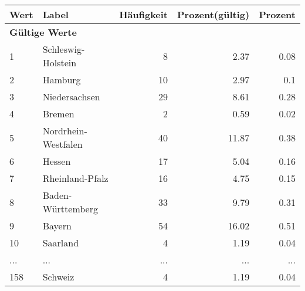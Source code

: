      \begin{longtable}{lXrrr}
     \toprule
     \textbf{Wert} & \textbf{Label} & \textbf{Häufigkeit} & \textbf{Prozent(gültig)} & \textbf{Prozent} \\
     \endhead
     \midrule
     \multicolumn{5}{l}{\textbf{Gültige Werte}}\\
        1 & \multicolumn{1}{X}{Schleswig-Holstein} & %
          \num{8} &
          \num[round-mode=places,round-precision=2]{2,37} &
          \num[round-mode=places,round-precision=2]{0,08} \\
        2 & \multicolumn{1}{X}{Hamburg} & %
          \num{10} &
          \num[round-mode=places,round-precision=2]{2,97} &
          \num[round-mode=places,round-precision=2]{0,1} \\
        3 & \multicolumn{1}{X}{Niedersachsen} & %
          \num{29} &
          \num[round-mode=places,round-precision=2]{8,61} &
          \num[round-mode=places,round-precision=2]{0,28} \\
        4 & \multicolumn{1}{X}{Bremen} & %
          \num{2} &
          \num[round-mode=places,round-precision=2]{0,59} &
          \num[round-mode=places,round-precision=2]{0,02} \\
        5 & \multicolumn{1}{X}{Nordrhein-Westfalen} & %
          \num{40} &
          \num[round-mode=places,round-precision=2]{11,87} &
          \num[round-mode=places,round-precision=2]{0,38} \\
        6 & \multicolumn{1}{X}{Hessen} & %
          \num{17} &
          \num[round-mode=places,round-precision=2]{5,04} &
          \num[round-mode=places,round-precision=2]{0,16} \\
        7 & \multicolumn{1}{X}{Rheinland-Pfalz} & %
          \num{16} &
          \num[round-mode=places,round-precision=2]{4,75} &
          \num[round-mode=places,round-precision=2]{0,15} \\
        8 & \multicolumn{1}{X}{Baden-Württemberg} & %
          \num{33} &
          \num[round-mode=places,round-precision=2]{9,79} &
          \num[round-mode=places,round-precision=2]{0,31} \\
        9 & \multicolumn{1}{X}{Bayern} & %
          \num{54} &
          \num[round-mode=places,round-precision=2]{16,02} &
          \num[round-mode=places,round-precision=2]{0,51} \\
        10 & \multicolumn{1}{X}{Saarland} & %
          \num{4} &
          \num[round-mode=places,round-precision=2]{1,19} &
          \num[round-mode=places,round-precision=2]{0,04} \\
       ... & ... & ... & ... & ... \\
        158 & \multicolumn{1}{X}{Schweiz} & %
          \num{4} &
          \num[round-mode=places,round-precision=2]{1,19} &
          \num[round-mode=places,round-precision=2]{0,04} \\


\end{longtable}

